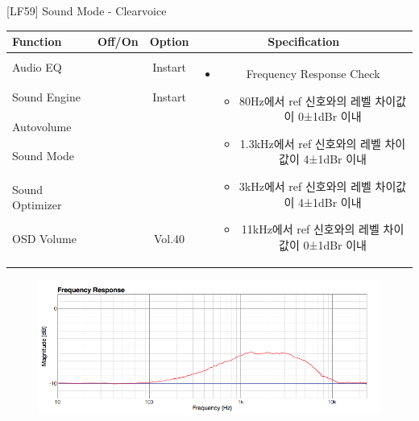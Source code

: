 \begin{frame}[t]{[LF59] Sound Mode - Clearvoice}
\begin{tiny}
\begin{tabular}{@{}lccc@{}}
\toprule
Function & Off/On & Option & Specification \\
\midrule
Audio EQ & \color{black}{Off} & Instart &
\multirow{8}{60mm}{
\begin{itemize}
\item Frequency Response Check
	\begin{itemize}
	\item 80Hz에서 ref 신호와의 레벨 차이값이 0±1dBr 이내
	\item 1.3kHz에서 ref 신호와의 레벨 차이값이 4±1dBr 이내
	\item 3kHz에서 ref 신호와의 레벨 차이값이 4±1dBr 이내
	\item 11kHz에서 ref 신호와의 레벨 차이값이 0±1dBr 이내
	\end{itemize}
\end{itemize}
} \\
Sound Engine & \color{blue}{On} & Instart & \\
Autovolume & \color{black}{Off} & & \\
Sound Mode & \color{blue}{On} & \color{blue}{Clearvoice} & \\
Sound Optimizer & \color{black}{Off} & & \\
OSD Volume & \color{blue}{On} & Vol.40 & \\
 & & & \\
 & & & \\
\midrule
\end{tabular}
\end{tiny}

\begin{figure}[b]
\includegraphics[height=0.4\textwidth]{figures/Clearvoice.png}
\end{figure}

\end{frame}
